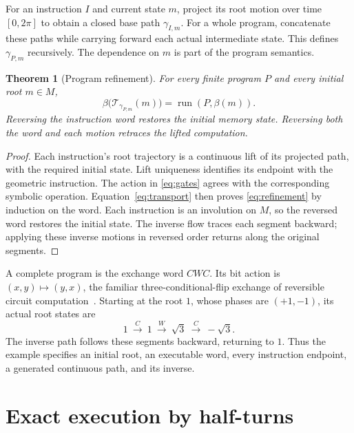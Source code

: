 \documentclass[11pt]{article}
\newtheorem{theorem}[proposition]{Theorem}
\newcommand{\T}{\mathcal T}
\begin{document}
For an instruction $I$ and current state $m$, project its root motion over
time $[0,2\pi]$ to obtain a closed base path $\gamma_{I,m}$. For a whole
program, concatenate these paths while carrying forward each actual
intermediate state. This defines $\gamma_{P,m}$ recursively. The dependence
on $m$ is part of the program semantics.

\begin{theorem}[Program refinement]\label{thm:program}
For every finite program $P$ and every initial root $m\in M$,
\begin{equation}\label{eq:refinement}
 \beta\bigl(\T_{\gamma_{P,m}}(m)\bigr)
       =\operatorname{run}(P,\beta(m)).
\end{equation}
Reversing the instruction word restores the initial memory state. Reversing
both the word and each motion retraces the lifted computation.
\end{theorem}
\begin{proof}
Each instruction's root trajectory is a continuous lift of its projected
path, with the required initial state. Lift uniqueness identifies its
endpoint with the geometric instruction. The action in
\eqref{eq:gates} agrees with the corresponding symbolic operation.
Equation~\eqref{eq:transport} then proves \eqref{eq:refinement} by induction
on the word. Each instruction is an involution on $M$, so the reversed word
restores the initial state. The inverse flow traces each segment backward;
applying these inverse motions in reversed order returns along the original
segments.
\end{proof}

A complete program is the exchange word $CWC$. Its bit action is
$(x,y)\mapsto(y,x)$, the familiar three-conditional-flip exchange of
reversible circuit computation~\cite{toffoli}. Starting at the root $1$, whose
phases are $(+1,-1)$, its actual root states are
\begin{equation}\label{eq:example}
 1\ \xrightarrow{C}\ 1\ \xrightarrow{W}\ \sqrt3
   \ \xrightarrow{C}\ -\sqrt3.
\end{equation}
The inverse path follows these segments backward, returning to $1$.
Thus the example specifies an initial root, an executable word, every
instruction endpoint, a generated continuous path, and its inverse.

\section{Exact execution by half-turns}
\end{document}
